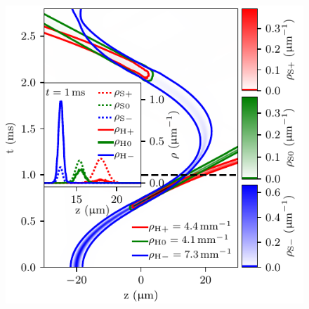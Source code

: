 {\begin{figure}
{    \includegraphics{figures/hidden_variables/hvsc_mirror/trajectories.pdf}
    }

\end{figure}}
